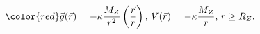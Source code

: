 \documentclass{scrbook}
\begin{document}
  \begin{equation*}\color{red}
    \vec{g}(\vec{r}) = - \kappa\dfrac{M_Z}{r^2}\left(\dfrac{\vec{r}}{r}\right),\,
    V(\vec{r}) = -\kappa\dfrac{M_Z}{r}, \, r\geq R_Z.
  \end{equation*}

  \begin{tcnote}
    \faEarlybirds \lipsum[2]
  \end{tcnote}
\end{document}
